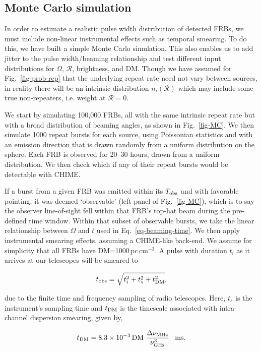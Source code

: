\documentclass[fleqn,usenatbib]{mnras}
\begin{document}
\subsection{Monte Carlo simulation}
\label{sect-MC}
In order to estimate a realistic pulse width distribution of 
detected FRBs, 
we must include non-linear instrumental effects such as  temporal smearing. 
To do this, we have built a simple Monte Carlo simulation. This also 
enables us to add jitter to the pulse width/beaming relationship and 
test different input distributions for $\Omega$, $\mathcal{R}$, 
brightness, and DM. Though we have assumed for Fig.~\ref{fig-prob-rep} 
that the underlying repeat 
rate need not vary between sources, in reality there will be an intrinsic  
distribution $n_i(\mathcal{R})$ which may include some true non-repeaters,
i.e. weight at $\mathcal{R}=0$.

We start by 
simulating 100,000 FRBs, all with the same intrinsic repeat rate but with a 
broad distribution of beaming angles, as shown in Fig.~\ref{fig-MC}. 
We then simulate 1000 repeat bursts for each source,
using Poissonian statistics and with an emission direction that is drawn 
randomly from a uniform distribution on the sphere. Each FRB 
is observed for 20--30 hours, drawn from a uniform distribution.
We then check which if any of their repeat
bursts would be detectable with CHIME.

If a burst from a given FRB was emitted within its $T_{\rm obs}$ and with favorable 
pointing, 
it was deemed `observable' (left panel of Fig.~\ref{fig-MC}), which is to say the observer line-of-sight fell within that FRB's top-hat beam during the pre-defined time window.
Within that subset of observable bursts, we take the linear relationship 
between $\Omega$ and $t$ used in Eq.~\ref{eq-beaming-time}. 
We then apply instrumental smearing effects, assuming a 
CHIME-like back-end. We assume for simplicity that all FRBs have DM=1000\,pc\,cm$^{-3}$. A pulse with duration $t_i$ as it arrives at our telescopes will be smeared to 

\begin{equation}
    t_{\rm obs} = \sqrt{t^2_i + t^2_s + t^2_{\rm DM}},
\end{equation}

\noindent due to the finite time and frequency sampling of radio telescopes. Here, $t_s$ is the instrument's sampling time and 
$t_{\rm DM}$ is the timescale associated with 
intra-channel dispersion smearing, given by, 

\begin{equation}
    t_{\rm DM} = 8.3\times10^{-3}\,\mathrm{DM}\,\,\frac{\Delta\nu_{\rm MHz}}{\nu^3_{\rm GHz}}\,\,\,\,\,\mathrm{ms}.
\end{equation}
\end{document}
